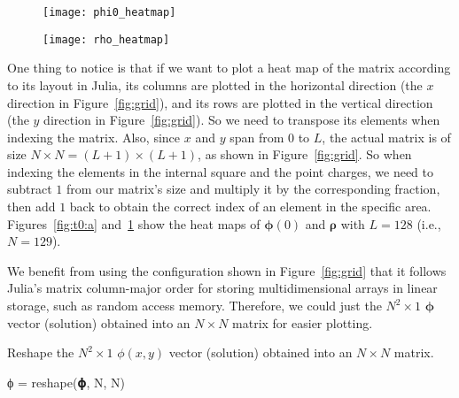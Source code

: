 \begin{figure}
    \centering
    \begin{minipage}[t]{0.49\linewidth}
        \centering
        \texttt{[image: phi0\_heatmap]}
        \label{fig:t0:a}
    \end{minipage}
    \hfill
    \begin{minipage}[t]{0.49\linewidth}
        \centering
        \texttt{[image: rho\_heatmap]}
        \label{fig:t0:b}
    \end{minipage}
\end{figure}

One thing to notice is that if we want to plot a heat map of
the matrix according to its layout in Julia, its columns are plotted in the
horizontal direction (the \(x\) direction in Figure~\ref{fig:grid}),
and its rows are plotted in the vertical direction
(the \(y\) direction in Figure~\ref{fig:grid}).
So we need to transpose its elements when indexing the matrix.
Also, since \(x\) and \(y\) span from \(0\) to \(L\), the actual matrix is of size
\(N \times N = (L + 1) \times (L + 1)\), as shown in Figure~\ref{fig:grid}.
So when indexing the elements in the internal square and the point charges,
we need to subtract \(1\) from our matrix's size and multiply it by the corresponding
fraction, then add \(1\) back to obtain the correct index of an element in the
specific area.
Figures~\ref{fig:t0:a} and~\ref{fig:t0:b} show the heat maps of
\(\bm{\phi}(0)\) and \(\bm{\rho}\) with \(L = 128\) (i.e., \(N = 129\)).

We benefit from using the configuration shown in Figure~\ref{fig:grid} that it follows
Julia's matrix column-major order for storing multidimensional arrays in linear storage, such
as random access memory.
Therefore, we could just  the \(N^2 \times 1\) \(\bm{\phi}\) vector
(solution) obtained into an \(N \times N\) matrix for easier plotting.
%
\begin{algorithm}
    \caption{Reshape the \(N^2 \times 1\) \(\phi(x, y)\) vector
        (solution) obtained into an \(N \times N\) matrix.}
    \label{lst:reshape}
    \begin{juliacode}
ϕ = reshape(𝛟, N, N)
    \end{juliacode}
\end{algorithm}
